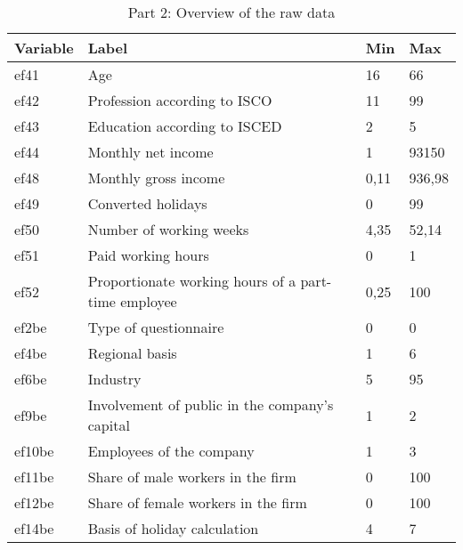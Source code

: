 \begin{table}[H]
\centering
\caption{Part 2: Overview of the raw data}
\label{raw2}
\begin{tabular}{|l|l|l|l|}
\hline
\textbf{Variable} & \textbf{Label}                                               & \textbf{Min}  & \textbf{Max}    \\ \hline
ef41     & Age                                                 & 16   & 66     \\ \hline
ef42       & Profession according to ISCO                           & 11     & 99      \\ \hline
ef43       & Education according to ISCED                           & 2      & 5       \\ \hline
ef44       & Monthly net income                                     & 1      & 93150   \\ \hline
ef48       & Monthly gross income                                   & 0,11   & 936,98  \\ \hline
ef49       & Converted holidays                                     & 0      & 99      \\ \hline
ef50       & Number of working weeks                                & 4,35   & 52,14   \\ \hline
ef51       & Paid working hours                                     & 0      & 1       \\ \hline
ef52       & Proportionate working hours of a part-time employee    & 0,25   & 100     \\ \hline
ef2be      & Type of questionnaire                                  & 0      & 0       \\ \hline
ef4be      & Regional basis                                         & 1      & 6       \\ \hline
ef6be      & Industry                                               & 5      & 95      \\ \hline
ef9be      & Involvement of public in the company's capital & 1      & 2       \\ \hline
ef10be     & Employees of the company                               & 1      & 3       \\ \hline
ef11be     & Share of male workers in the firm                      & 0      & 100     \\ \hline
ef12be     & Share of female workers in the firm                    & 0      & 100     \\ \hline
ef14be     & Basis of holiday calculation                           & 4      & 7       \\ \hline

\end{tabular}
\end{table}
